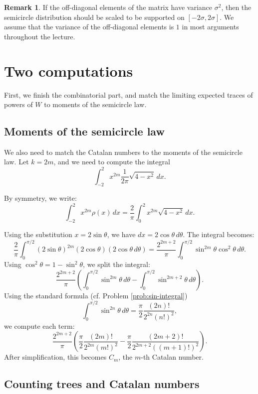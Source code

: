 \documentclass[letterpaper,11pt,oneside,reqno]{article}
\numberwithin{equation}{section}
\theoremstyle{definition}
\newtheorem{remark}[proposition]{Remark}
\begin{document}
\begin{remark}
	If the off-diagonal elements of the matrix have variance $\sigma^2$, then the
	semicircle distribution should be scaled to be supported on $[-2\sigma,2\sigma]$.
	We assume that the variance of the off-diagonal elements is $1$
	in most arguments throughout the lecture.
\end{remark}

\section{Two computations}

First, we finish the combinatorial part,
and match the limiting expected traces of powers of $W$
to moments of the semicircle law.

\subsection{Moments of the semicircle law}

We also need to match the Catalan numbers to the moments of the semicircle law.
Let $k=2m$, and we need to compute
the integral
\begin{equation*}
	\int_{-2}^{2} x^{2m} \frac{1}{2\pi} \sqrt{4-x^2} \, dx.
\end{equation*}

By symmetry, we write:
\[
\int_{-2}^2 x^{2m}\rho(x)\, dx = \frac{2}{\pi} \int_0^2 x^{2m} \sqrt{4-x^2}\, dx.
\]

Using the substitution \(x = 2\sin\theta\), we have \(dx = 2\cos\theta\, d\theta\). The integral becomes:
\[
\frac{2}{\pi} \int_0^{\pi/2} (2\sin\theta)^{2m} (2\cos\theta) (2\cos\theta\, d\theta)
= \frac{2^{2m+2}}{\pi} \int_0^{\pi/2} \sin^{2m}\theta \cos^2\theta\, d\theta.
\]
Using \(\cos^2\theta = 1 - \sin^2\theta\), we split the integral:
\[
\frac{2^{2m+2}}{\pi} \left( \int_0^{\pi/2} \sin^{2m}\theta\, d\theta - \int_0^{\pi/2} \sin^{2m+2}\theta\, d\theta \right).
\]
Using the standard formula (cf. Problem \ref{prob:sin-integral})
\begin{equation}
	\label{eq:sin-integral}
\int_0^{\pi/2} \sin^{2n}\theta\, d\theta = \frac{\pi}{2} \frac{(2n)!}{2^{2n} (n!)^2},
\end{equation}
we compute each term:
\[
\frac{2^{2m+2}}{\pi} \left( \frac{\pi}{2} \frac{(2m)!}{2^{2m}(m!)^2} - \frac{\pi}{2} \frac{(2m+2)!}{2^{2m+2}((m+1)!)^2} \right).
\]
After simplification, this becomes
$C_m$, the $m$-th Catalan number.

\subsection{Counting trees and Catalan numbers}
\end{document}

